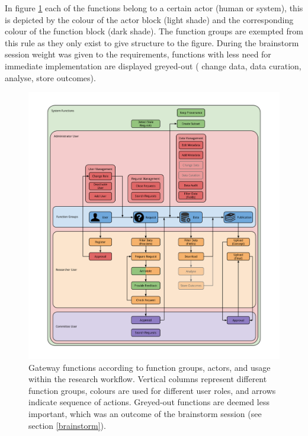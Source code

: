In figure \ref{fig:functions-workflow} each of the functions belong to a certain actor (human or system), this is depicted by the colour of the actor block (light shade) and the corresponding colour of the function block (dark shade).
The function groups are exempted from this rule as they only exist to give structure to the figure.
During the brainstorm session weight was given to the requirements, functions with less need for immediate implementation are displayed greyed-out (\ie{} change data, data curation, analyse, store outcomes).

\begin{figure}[!htb]
	\centering
	\includegraphics[width=1.0\linewidth]{images/functions-in-workflow}
	\caption{
		Gateway functions according to function groups, actors, and usage within the research workflow.
		Vertical columns represent different function groups, colours are used for different user roles, and arrows indicate sequence of actions.
		Greyed-out functions are deemed less important, which was an outcome of the brainstorm session (see section \ref{brainstorm}).
	}
	\label{fig:functions-workflow}
\end{figure}